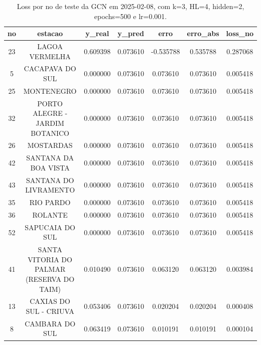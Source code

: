 \begin{table}[h]
\centering
\caption{Loss por no de teste da GCN em 2025-02-08, com k=3, HL=4, hidden=2, epochs=500 e lr=0.001.}
\label{tab:gcn_loss_k3_hl4_h2_e500_d20250208}
\begin{tabular}{ccccccc}
\toprule
no & estacao & y\_real & y\_pred & erro & erro\_abs & loss\_no \\
\midrule
23 & LAGOA VERMELHA & 0.609398 & 0.073610 & -0.535788 & 0.535788 & 0.287068 \\
5 & CACAPAVA DO SUL & 0.000000 & 0.073610 & 0.073610 & 0.073610 & 0.005418 \\
25 & MONTENEGRO & 0.000000 & 0.073610 & 0.073610 & 0.073610 & 0.005418 \\
32 & PORTO ALEGRE - JARDIM BOTANICO & 0.000000 & 0.073610 & 0.073610 & 0.073610 & 0.005418 \\
26 & MOSTARDAS & 0.000000 & 0.073610 & 0.073610 & 0.073610 & 0.005418 \\
42 & SANTANA DA BOA VISTA & 0.000000 & 0.073610 & 0.073610 & 0.073610 & 0.005418 \\
43 & SANTANA DO LIVRAMENTO & 0.000000 & 0.073610 & 0.073610 & 0.073610 & 0.005418 \\
35 & RIO PARDO & 0.000000 & 0.073610 & 0.073610 & 0.073610 & 0.005418 \\
36 & ROLANTE & 0.000000 & 0.073610 & 0.073610 & 0.073610 & 0.005418 \\
52 & SAPUCAIA DO SUL & 0.000000 & 0.073610 & 0.073610 & 0.073610 & 0.005418 \\
41 & SANTA VITORIA DO PALMAR (RESERVA DO TAIM) & 0.010490 & 0.073610 & 0.063120 & 0.063120 & 0.003984 \\
13 & CAXIAS DO SUL - CRIUVA & 0.053406 & 0.073610 & 0.020204 & 0.020204 & 0.000408 \\
8 & CAMBARA DO SUL & 0.063419 & 0.073610 & 0.010191 & 0.010191 & 0.000104 \\
\bottomrule
\end{tabular}
\end{table}
